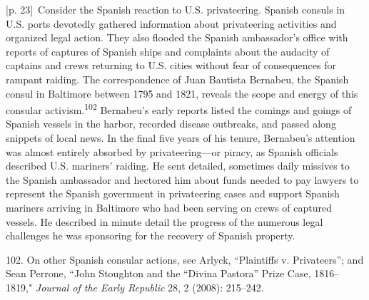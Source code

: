 \documentclass[10pt,a4paper]{article}
\begin{document}
{\scriptsize\color{gray} [p. 23]}\ Consider the Spanish reaction to U.S. privateering. Spanish consuls in U.S. ports devotedly gathered information about privateering activities and organized legal action. They also flooded the Spanish ambassador’s office with reports of captures of Spanish ships and complaints about the audacity of captains and crews returning to U.S. cities without fear of consequences for rampant raiding. The correspondence of Juan Bautista Bernabeu, the Spanish consul in Baltimore between 1795 and 1821, reveals the scope and energy of this consular activism.\nobreak\textsuperscript{102} Bernabeu’s early reports listed the comings and goings of Spanish vessels in the harbor, recorded disease outbreaks, and passed along snippets of local news. In the final five years of his tenure, Bernabeu’s attention was almost entirely absorbed by privateering—or piracy, as Spanish officials described U.S. mariners’ raiding. He sent detailed, sometimes daily missives to the Spanish ambassador and hectored him about funds needed to pay lawyers to represent the Spanish government in privateering cases and support Spanish mariners arriving in Baltimore who had been serving on crews of captured vessels. He described in minute detail the progress of the numerous legal challenges he was sponsoring for the recovery of Spanish property.\par{\small 102. On other Spanish consular actions, see Arlyck, “Plaintiffs v. Privateers”; and Sean Perrone, “John Stoughton and the “Divina Pastora” Prize Case, 1816–1819," \textit{Journal of the Early Republic} 28, 2 (2008): 215–242.\par}
\end{document}
